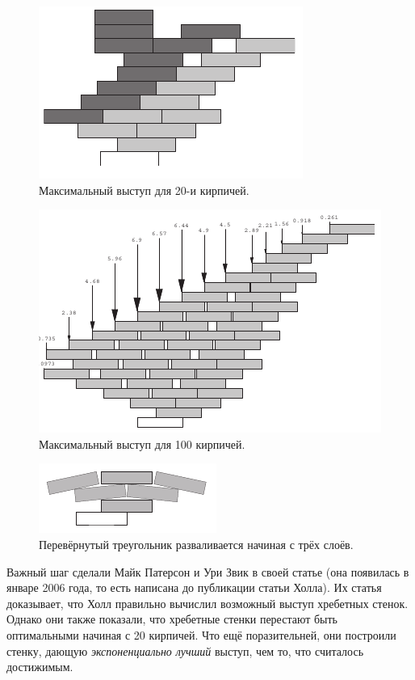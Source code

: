 \begin{figure}[htb!]
\centering
\includegraphics[scale=1]{pics/kirpich3}
\caption{Максимальный выступ для 20-и кирпичей.}
\label{pic:kirpich3}
\end{figure}

\begin{figure}[htb!]
\centering
\includegraphics[scale=1]{pics/kirpich4}
\caption{Максимальный выступ для 100 кирпичей.}
\label{pic:kirpich4}
\end{figure}

\begin{figure}[htb!]
\centering
\includegraphics[scale=1]{pics/kirpich5}
\caption{Перевёрнутый треугольник разваливается начиная с трёх слоёв.}
\label{pic:kirpich5}
\end{figure}

Важный шаг сделали Майк Патерсон и Ури Звик в своей статье \cite{47} (она появилась в январе 2006 года, то есть написана до публикации статьи Холла).
Их статья доказывает, что Холл правильно вычислил возможный выступ хребетных стенок.
Однако они также показали, что хребетные стенки перестают быть оптимальными начиная с 20 кирпичей.
Что ещё поразительней, они построили стенку, дающую \emph{экспоненциально лучший} выступ, чем то, что считалось достижимым.

